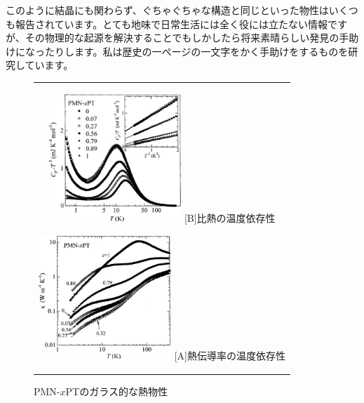 \documentclass[10pt,b5paper,papersize,dvipdfmx]{jsbook}
\begin{document}
このように結晶にも関わらず、ぐちゃぐちゃな構造と同じといった物性はいくつも報告されています。とても地味で日常生活には全く役には立たない情報ですが、その物理的な起源を解決することでもしかしたら将来素晴らしい発見の手助けになったりします。私は歴史の一ページの一文字をかく手助けをするものを研究しています。
\begin{figure}[htbp]
  \begin{center}
      \begin{tabular}{c}  
      \begin{minipage}{0.5\hsize}
          \begin{center}
            \includegraphics[clip, width=5cm]{img/relaxor-heat-capacity.pdf}
            \hspace{1.6cm} [B]比熱の温度依存性
          \end{center}
        \end{minipage}
        \begin{minipage}{0.5\hsize}
          \begin{center}
            \includegraphics[clip, width=5cm]{img/relaxor-thermal-conductivity.pdf}
            \hspace{1.6cm} [A]熱伝導率の温度依存性
      \end{center}
      \end{minipage}
      \end{tabular}
      \caption{PMN-$x$PTのガラス的な熱物性\cite{relaxCT}}
      \label{fig:lena}
  \end{center}
\end{figure}
\end{document}
